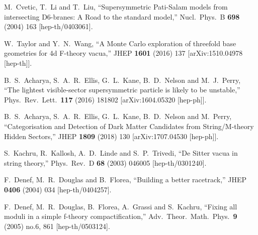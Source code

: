 \documentclass[11pt,a4paper]{article}
\begin{document}
\begin{thebibliography}{99}
  M.~Cvetic, T.~Li and T.~Liu,
  ``Supersymmetric Pati-Salam models from intersecting D6-branes: A Road to the standard model,''
  Nucl.\ Phys.\ B {\bf 698} (2004) 163
  [hep-th/0403061].


  W.~Taylor and Y.~N.~Wang,
  ``A Monte Carlo exploration of threefold base geometries for 4d F-theory vacua,''
  JHEP {\bf 1601} (2016) 137
  [arXiv:1510.04978 [hep-th]].


  B.~S.~Acharya, S.~A.~R.~Ellis, G.~L.~Kane, B.~D.~Nelson and M.~J.~Perry,
  ``The lightest visible-sector supersymmetric particle is likely to be unstable,''
  Phys.\ Rev.\ Lett.\  {\bf 117} (2016) 181802
  [arXiv:1604.05320 [hep-ph]].


  B.~S.~Acharya, S.~A.~R.~Ellis, G.~L.~Kane, B.~D.~Nelson and M.~Perry,
  ``Categorisation and Detection of Dark Matter Candidates from String/M-theory Hidden Sectors,''
  JHEP {\bf 1809} (2018) 130
  [arXiv:1707.04530 [hep-ph]].
  


  S.~Kachru, R.~Kallosh, A.~D.~Linde and S.~P.~Trivedi,
  ``De Sitter vacua in string theory,''
  Phys.\ Rev.\ D {\bf 68} (2003) 046005
  [hep-th/0301240].


  F.~Denef, M.~R.~Douglas and B.~Florea,
  ``Building a better racetrack,''
  JHEP {\bf 0406} (2004) 034
  [hep-th/0404257].


  F.~Denef, M.~R.~Douglas, B.~Florea, A.~Grassi and S.~Kachru,
  ``Fixing all moduli in a simple f-theory compactification,''
  Adv.\ Theor.\ Math.\ Phys.\  {\bf 9} (2005) no.6,  861
  [hep-th/0503124].



\end{thebibliography}
\end{document}
